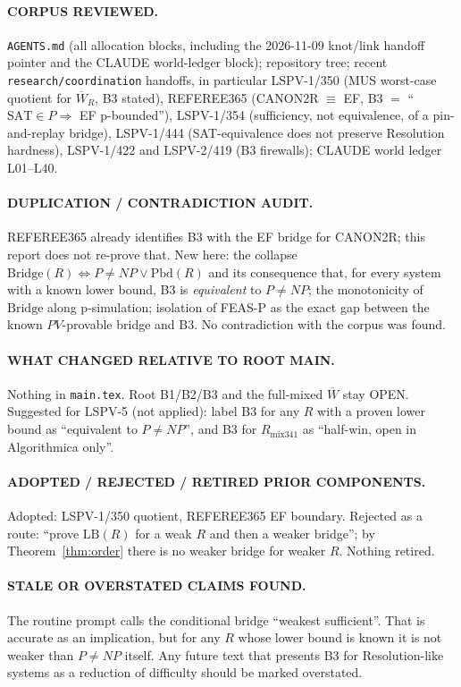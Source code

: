 \documentclass[11pt]{article}
\theoremstyle{definition}
\theoremstyle{remark}
\newcommand{\SAT}{\mathrm{SAT}}
\newcommand{\Wb}{\overline W}
\newcommand{\Br}{\mathrm{Bridge}}
\newcommand{\Pbd}{\mathrm{Pbd}}
\newcommand{\LB}{\mathrm{LB}}
\begin{document}
\paragraph{CORPUS REVIEWED.} \texttt{AGENTS.md} (all allocation blocks, including the 2026-11-09 knot/link
handoff pointer and the CLAUDE world-ledger block); repository tree; recent \texttt{research/coordination}
handoffs, in particular LSPV-1/350 (MUS worst-case quotient for $\Wb_R$, B3 stated), REFEREE365
(CANON2R $\equiv$ EF, B3 $=$ ``$\SAT\in P\Rightarrow$ EF p-bounded''), LSPV-1/354 (sufficiency, not
equivalence, of a pin-and-replay bridge), LSPV-1/444 (SAT-equivalence does not preserve Resolution hardness),
LSPV-1/422 and LSPV-2/419 (B3 firewalls); CLAUDE world ledger L01--L40.

\paragraph{DUPLICATION / CONTRADICTION AUDIT.} REFEREE365 already identifies B3 with the EF bridge for
CANON2R; this report does not re-prove that. New here: the collapse $\Br(R)\iff P\ne NP\vee\Pbd(R)$ and its
consequence that, for every system with a known lower bound, B3 is \emph{equivalent} to $P\ne NP$; the
monotonicity of $\Br$ along p-simulation; isolation of FEAS-P as the exact gap between the known
$PV$-provable bridge and B3. No contradiction with the corpus was found.

\paragraph{WHAT CHANGED RELATIVE TO ROOT MAIN.} Nothing in \texttt{main.tex}. Root B1/B2/B3 and the full-mixed
$\Wb$ stay OPEN. Suggested for LSPV-5 (not applied): label B3 for any $R$ with a proven lower bound as
``equivalent to $P\ne NP$'', and B3 for $R_{\mathrm{mix341}}$ as ``half-win, open in Algorithmica only''.

\paragraph{ADOPTED / REJECTED / RETIRED PRIOR COMPONENTS.} Adopted: LSPV-1/350 quotient, REFEREE365 EF
boundary. Rejected as a route: ``prove $\LB(R)$ for a weak $R$ and then a weaker bridge''; by
Theorem~\ref{thm:order} there is no weaker bridge for weaker $R$. Nothing retired.

\paragraph{STALE OR OVERSTATED CLAIMS FOUND.} The routine prompt calls the conditional bridge ``weakest
sufficient''. That is accurate as an implication, but for any $R$ whose lower bound is known it is not weaker
than $P\ne NP$ itself. Any future text that presents B3 for Resolution-like systems as a reduction of
difficulty should be marked overstated.
\end{document}
